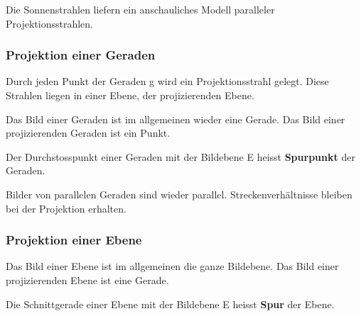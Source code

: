 \documentclass[%
11pt,%
twoside,%
titlepage,%
a4page,%
german,%
headsepline%
]{scrartcl}
\begin{document}
\begin{bem}
Die Sonnenstrahlen liefern ein anschauliches Modell paralleler Projektionsstrahlen.
\end{bem}

\subsubsection{Projektion einer Geraden}
Durch jeden Punkt der Geraden g wird ein Projektionsstrahl gelegt. Diese Strahlen liegen in einer Ebene, der projizierenden Ebene.

Das Bild einer Geraden ist im allgemeinen wieder eine Gerade. Das Bild einer projizierenden Geraden ist ein Punkt.
\begin{defn}
Der Durchstosspunkt einer Geraden mit der Bildebene E heisst \textbf{Spurpunkt} der Geraden.
\end{defn}
Bilder von parallelen Geraden sind wieder parallel. Streckenverh\"altnisse bleiben bei der Projektion erhalten.

\subsubsection{Projektion einer Ebene}
Das Bild einer Ebene ist im allgemeinen die ganze Bildebene. Das Bild einer projizierenden Ebene ist eine Gerade.
\begin{defn}
Die Schnittgerade einer Ebene mit der Bildebene E heisst \textbf{Spur} der Ebene.
\end{defn}
\end{document}
